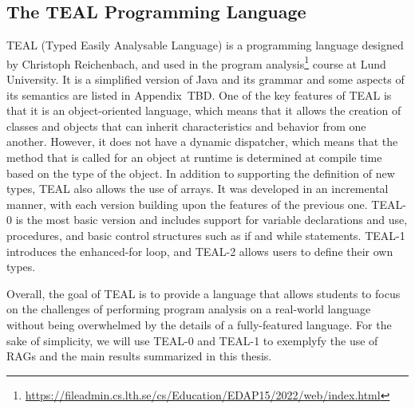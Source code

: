 \subsection{The TEAL Programming Language}
TEAL (Typed Easily Analysable Language) is a programming language designed by Christoph Reichenbach, and  used in the
program analysis\footnote{\url{https://fileadmin.cs.lth.se/cs/Education/EDAP15/2022/web/index.html}} course at Lund University.
It is a simplified version of Java and its grammar and some aspects of its semantics are
listed in Appendix~TBD.  %
One of the key features of TEAL is that it is an object-oriented language,
which means that it allows the creation of classes and objects that can inherit
characteristics and behavior from one another. However, it does not have a dynamic
dispatcher, which means that the method that is called for an object at runtime
is determined at compile time based on the type of the object.
In addition to supporting the definition of new types, TEAL also allows the use
of arrays. It was developed in an incremental manner, with each version building
upon the features of the previous one. TEAL-0 is the most basic version and includes
support for variable declarations and use, procedures, and basic control structures such as if
and while statements. TEAL-1 introduces the enhanced-for loop, and TEAL-2 allows users to
define their own types.

Overall, the goal of TEAL is to provide a language that allows students to
focus on the challenges of performing program analysis on a real-world language
without being overwhelmed by the details of a fully-featured language.
For the sake of simplicity, we will use TEAL-0 and TEAL-1 to exemplyfy the use of RAGs 
and the main results summarized in this thesis.

